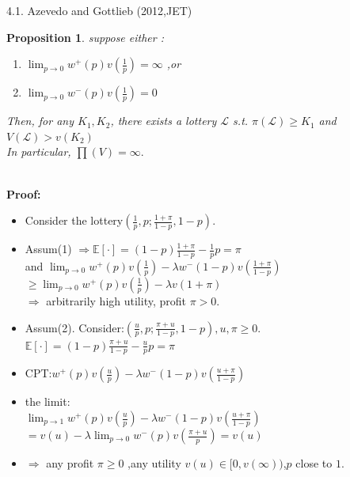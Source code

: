 \documentclass[11pt,aspectratio=169]{beamer}
\newtheorem{proposition}{Proposition}
\begin{document}
\begin{frame}{4.1. Azevedo and Gottlieb (2012,JET)}
    \begin{proposition}
    suppose either :
    \begin{enumerate}[(1)]
        \item $\lim_{p \to 0} w^{+}(p)v(\frac{1}{p})=\infty  $ ,or\\
        \item $\lim_{p \to 0} w^{-}(p)v(\frac{1}{p})=0  $\\
    \end{enumerate}
    Then, for any $K_1,K_2$, there exists a lottery $\mathcal{L}$ 
    s.t. $\pi(\mathcal{L}) \geq K_1$ and $V(\mathcal{L}) >v(K_2)$\\
    In particular, $\prod (V)=\infty.$\\
    \end{proposition}
    \hspace*{\fill} \\
\textbf{Proof:}\\
\begin{itemize}
    \item Consider the lottery$ (\frac{1}{p},p;\frac{1+\pi}{1-p},1-p)$.\\
    \item Assum(1) $\Rightarrow \mathbb{E} [\cdot]= (1- p)\frac{1+\pi}{1-p}-\frac{1}{p}p =\pi  $\\
and $\lim_{p \to 0} w^{+}(p)v(\frac{1}{p})- \lambda w^{-}(1-p)v(\frac{1+\pi}{1-p})  $
$\geq \lim_{p \to 0} w^{+}(p)v(\frac{1}{p})- \lambda v(1+\pi)$\\
$\Rightarrow $  arbitrarily high utility, profit $\pi >0$.  
\end{itemize}
\end{frame}

\begin{frame}
    \begin{itemize}
        \item Assum(2). Consider:$ (\frac{u}{p},p;\frac{\pi+u}{1-p},1-p), u,\pi \geq 0.$\\
    $ \mathbb{E} [\cdot]= (1- p)\frac{\pi+u}{1-p}-\frac{u}{p}p =\pi  $\\
    \item CPT:$ w^{+}(p)v(\frac{u}{p})- \lambda w^{-}(1-p)v(\frac{u+\pi}{1-p})  $\\
    \item the limit:\\
 $\lim_{p \to 1}w^{+}(p)v(\frac{u}{p})- \lambda w^{-}(1-p)v(\frac{u+\pi}{1-p})$\\
    $=v(u) -\lambda \lim_{p \to 0} w^{-}(p)v(\frac{\pi+u}{p})=v(u)$\\
    \item $\Rightarrow $  any profit $\pi \geq 0$ ,any utility $v(u) \in [0,v(\infty))$,$p$ close to $1$.
\end{itemize}
\end{frame}
\end{document}
